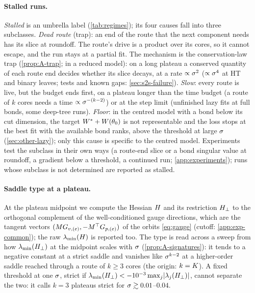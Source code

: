 \paragraph{Stalled runs.}
\emph{Stalled} is an umbrella label (\cref{tab:regimes}); its four causes fall into three
subclasses. \emph{Dead route} (trap): an end of the route that the next component needs has its slice
at roundoff. The route's drive is a product over its cores, so it cannot escape, and the run stays at
a partial fit. The mechanism is the conservation-law trap (\cref{prop:A-trap}; \derived{} in a reduced
model): on a long plateau a conserved quantity of each route end decides whether its slice decays, at a
rate $\propto\sigma^2$ ($\propto\sigma^4$ at HT and binary leaves; tests and known gaps: \cref{sec:s2s-failure}). \emph{Slow}: every route is live,
but the budget ends first, on a plateau longer than the time budget (a route of $k$ cores needs a time
$\propto\sigma^{-(k-2)}$) or at the step limit (unfinished lazy fits at full bonds, some deep-tree runs).
\emph{Floor}: in the centred model with a bond below its cut dimension, the target $W^{*}+W(\theta_0)$
is not representable and the loss stops at the best fit with the available bond ranks, above the
threshold at large $\sigma$ (\cref{sec:other-lazy}); only this cause is specific to the centred model.
Experiments test the subclass in their own ways (a route-end slice or a bond singular value at
roundoff, a gradient below a threshold, a continued run; \cref{app:experiments}); runs whose subclass
is not determined are reported as stalled.

\paragraph{Saddle type at a plateau.}
At the plateau midpoint we compute the Hessian $H$ and its restriction $H_{\perp}$ to the
orthogonal complement of the well-conditioned gauge directions, which are the tangent vectors
$(MG_{v,(e)},-M^{\top}G_{p,(e)})$ of the orbits \eqref{eq:gauge} (cutoff: \cref{app:exp-common}); the raw
$\lambda_{\min}(H)$ is reported too. The type is read across a sweep from how $\lambda_{\min}(H_{\perp})$ at the midpoint scales with
$\sigma$ (\cref{prop:A-signatures}): it tends to a negative constant at a strict saddle and vanishes like
$\sigma^{k-2}$ at a higher-order saddle reached through a route of $k\ge3$ cores (the origin: $k=K$).
A fixed threshold at one $\sigma$, strict if $\lambda_{\min}(H_{\perp})<-10^{-3}\max_j\lvert\lambda_j(H_{\perp})\rvert$,
cannot separate the two: it calls $k=3$ plateaus strict for $\sigma\gtrsim0.01$--$0.04$.

